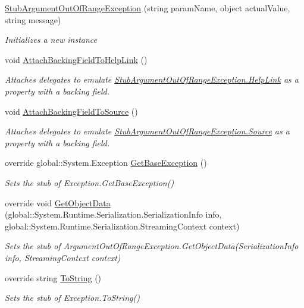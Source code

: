 \begin{DoxyCompactItemize}
\hyperlink{class_system_1_1_fakes_1_1_stub_argument_out_of_range_exception_aa8775bf9142295842129684cda2c5712}{Stub\-Argument\-Out\-Of\-Range\-Exception} (string param\-Name, object actual\-Value, string message)
\begin{DoxyCompactList}\small\item\em Initializes a new instance\end{DoxyCompactList}\item 
void \hyperlink{class_system_1_1_fakes_1_1_stub_argument_out_of_range_exception_a4e550d399ca987049d440d3cf486e58f}{Attach\-Backing\-Field\-To\-Help\-Link} ()
\begin{DoxyCompactList}\small\item\em Attaches delegates to emulate \hyperlink{class_system_1_1_fakes_1_1_stub_argument_out_of_range_exception_ac375923652844bc844f031e8cb569de3}{Stub\-Argument\-Out\-Of\-Range\-Exception.\-Help\-Link} as a property with a backing field.\end{DoxyCompactList}\item 
void \hyperlink{class_system_1_1_fakes_1_1_stub_argument_out_of_range_exception_ac730ba458465ea2af9a147dcf3e5d74a}{Attach\-Backing\-Field\-To\-Source} ()
\begin{DoxyCompactList}\small\item\em Attaches delegates to emulate \hyperlink{class_system_1_1_fakes_1_1_stub_argument_out_of_range_exception_af0a4d3e59f5225c7ffe81b5193692d13}{Stub\-Argument\-Out\-Of\-Range\-Exception.\-Source} as a property with a backing field.\end{DoxyCompactList}\item 
override global\-::\-System.\-Exception \hyperlink{class_system_1_1_fakes_1_1_stub_argument_out_of_range_exception_ae61b93e6d06ec8f6cada83e53a868aec}{Get\-Base\-Exception} ()
\begin{DoxyCompactList}\small\item\em Sets the stub of Exception.\-Get\-Base\-Exception()\end{DoxyCompactList}\item 
override void \hyperlink{class_system_1_1_fakes_1_1_stub_argument_out_of_range_exception_a4242dbaa000145aeca43584c59eb8c3a}{Get\-Object\-Data} (global\-::\-System.\-Runtime.\-Serialization.\-Serialization\-Info info, global\-::\-System.\-Runtime.\-Serialization.\-Streaming\-Context context)
\begin{DoxyCompactList}\small\item\em Sets the stub of Argument\-Out\-Of\-Range\-Exception.\-Get\-Object\-Data(\-Serialization\-Info info, Streaming\-Context context)\end{DoxyCompactList}\item 
override string \hyperlink{class_system_1_1_fakes_1_1_stub_argument_out_of_range_exception_a524b41e6ff068939df613be31432bec3}{To\-String} ()
\begin{DoxyCompactList}\small\item\em Sets the stub of Exception.\-To\-String()\end{DoxyCompactList}\end{DoxyCompactItemize}
